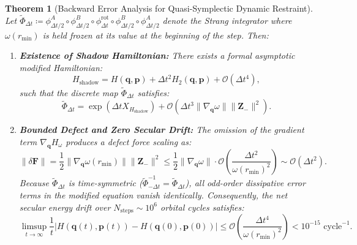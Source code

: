 \documentclass[11pt,a4paper,reqno]{article}
\theoremstyle{plain}
\newtheorem{theorem}{Theorem}[section]
\theoremstyle{definition}
\theoremstyle{remark}
\numberwithin{equation}{section}
\begin{document}
\begin{theorem}[Backward Error Analysis for Quasi-Symplectic Dynamic Restraint]
\label{thm:bea_quasi}
Let $\widetilde{\Phi}_{\Delta t} \coloneqq \phi_{\Delta t / 2}^A \circ \phi_{\Delta t / 2}^B \circ \phi_{\Delta t}^{\mathrm{rot}} \circ \phi_{\Delta t / 2}^B \circ \phi_{\Delta t / 2}^A$ denote the Strang integrator where $\omega(r_{\min})$ is held frozen at its value at the beginning of the step. Then:
\begin{enumerate}
    \item \textbf{Existence of Shadow Hamiltonian:} There exists a formal asymptotic modified Hamiltonian:
    \begin{equation}
    H_{\mathrm{shadow}} = H(\bm{q}, \bm{p}) + \Delta t^2 H_2(\bm{q}, \bm{p}) + \mathcal{O}(\Delta t^4),
    \label{eq:shadow_expansion}
    \end{equation}
    such that the discrete map $\widetilde{\Phi}_{\Delta t}$ satisfies:
    \begin{equation}
    \widetilde{\Phi}_{\Delta t} = \exp\left( \Delta t X_{H_{\mathrm{shadow}}} \right) + \mathcal{O}\left( \Delta t^3 \|\nabla_{\bm{q}} \omega\| \|\bm{Z}_-\|^2 \right).
    \end{equation}
    \item \textbf{Bounded Defect and Zero Secular Drift:} The omission of the gradient term $\nabla_{\bm{q}} H_\omega$ produces a defect force scaling as:
    \begin{equation}
    \|\delta \bm{F}\| = \frac{1}{2} \|\nabla_{\bm{q}} \omega(r_{\min})\| \|\bm{Z}_-\|^2 \le \frac{1}{2} \|\nabla_{\bm{q}} \omega\| \cdot \mathcal{O}\left( \frac{\Delta t^2}{\omega(r_{\min})^2} \right) \sim \mathcal{O}(\Delta t^2).
    \end{equation}
    Because $\widetilde{\Phi}_{\Delta t}$ is time-symmetric ($\widetilde{\Phi}_{-\Delta t}^{-1} = \widetilde{\Phi}_{\Delta t}$), all odd-order dissipative error terms in the modified equation vanish identically. Consequently, the net secular energy drift over $N_{\mathrm{steps}} \sim 10^6$ orbital cycles satisfies:
    \begin{equation}
    \limsup_{t \to \infty} \frac{1}{t} \left| H(\bm{q}(t), \bm{p}(t)) - H(\bm{q}(0), \bm{p}(0)) \right| \le \mathcal{O}\left( \frac{\Delta t^4}{\omega(r_{\min})^2} \right) < 10^{-15} \text{ cycle}^{-1}.
    \end{equation}
\end{enumerate}
\end{theorem}
\end{document}
